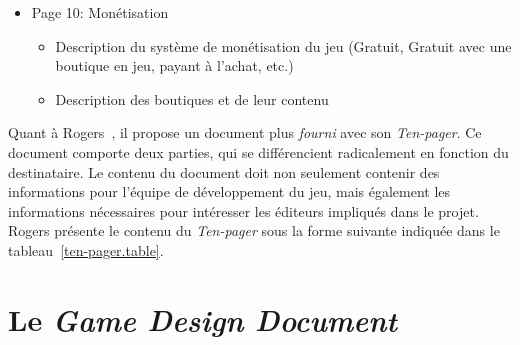 \begin{table}
\begin{framed}
\begin{itemize}
    \item Page 10: Monétisation
    \begin{itemize}
        \item Description du système de monétisation du jeu (Gratuit, Gratuit avec une boutique en jeu, payant à l'achat, etc.)
        \item Description des boutiques et de leur contenu
    \end{itemize}
\end{itemize}
\end{framed}
\caption{Contenu du \emph{Ten-pager} selon Rogers~\cite{LevelUpRogers2014} (suite).}
\label{ten-pager.table}
\end{table}

Quant \`a Rogers~\cite{LevelUpRogers2014}, il  propose un document plus \emph{fourni} avec son \emph{Ten-pager}. Ce document comporte deux parties, qui se différencient radicalement en fonction du destinataire. Le contenu du document doit non seulement contenir des informations pour l'équipe de développement du jeu, mais également les informations nécessaires pour int\'eresser les éditeurs impliqués dans le projet. Rogers présente le contenu du \emph{Ten-pager} sous la forme suivante indiqu\'ee dans le tableau~\ref{ten-pager.table}.
%
    




\section{Le \emph{Game Design Document}}





